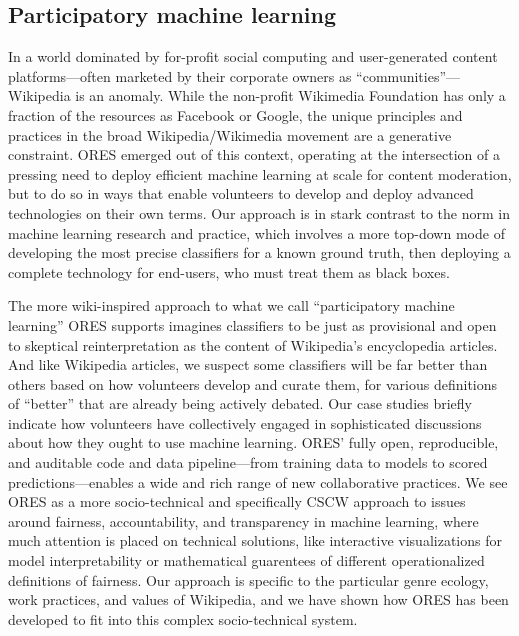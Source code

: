 \subsection{Participatory machine learning}
In a world dominated by for-profit social computing and user-generated content platforms---often marketed by their corporate owners as ``communities''\cite{gillespie2018custodians}---Wikipedia is an anomaly. While the non-profit Wikimedia Foundation has only a fraction of the resources as Facebook or Google, the unique principles and practices in the broad Wikipedia/Wikimedia movement are a generative constraint. ORES emerged out of this context, operating at the intersection of a pressing need to deploy efficient machine learning at scale for content moderation, but to do so in ways that enable volunteers to develop and deploy advanced technologies on their own terms. Our approach is in stark contrast to the norm in machine learning research and practice, which involves a more top-down mode of developing the most precise classifiers for a known ground truth, then deploying a complete technology for end-users, who must treat them as black boxes.

The more wiki-inspired approach to what we call ``participatory machine learning'' ORES supports imagines classifiers to be just as provisional and open to skeptical reinterpretation as the content of Wikipedia's encyclopedia articles. And like Wikipedia articles, we suspect some classifiers will be far better than others based on how volunteers develop and curate them, for various definitions of ``better'' that are already being actively debated. Our case studies briefly indicate how volunteers have collectively engaged in sophisticated discussions about how they ought to use machine learning. ORES' fully open, reproducible, and auditable code and data pipeline---from training data to models to scored predictions---enables a wide and rich range of new collaborative practices. We see ORES as a more socio-technical and specifically CSCW approach to issues around fairness, accountability, and transparency in machine learning, where much attention is placed on technical solutions, like interactive visualizations for model interpretability or mathematical guarentees of different operationalized definitions of fairness. Our approach is specific to the particular genre ecology, work practices, and values of Wikipedia, and we have shown how ORES has been developed to fit into this complex socio-technical system.

